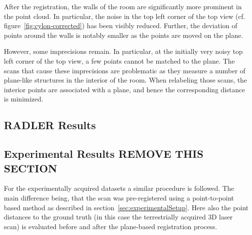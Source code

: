 After the registration, the walls of the room are significantly more prominent in the point cloud. 
In particular, the noise in the top left corner of the top view (cf. figure~\ref{fig:cylon-corrected}) has been visibly reduced.
Further, the deviation of points around the walls is notably smaller as the points are moved on the plane.

However, some imprecisions remain. 
In particular, at the initially very noisy top left corner of the top view, a few points cannot be matched to the plane. 
The scans that cause these imprecisions are problematic as they measure a number of plane-like structures in the interior of the room. 
When relabeling those scans, the interior points are associated with a plane, and hence the corresponding distance is minimized. 


\iffalse
\subsection{RADLER Results}

\subsection{Experimental Results REMOVE THIS SECTION}

For the experimentally acquired datasets a similar procedure is followed. 
The main difference being, that the scan was pre-registered using a point-to-point based method as described in section~\ref{sec:experimentalSetup}. 
Here also the point distances to the ground truth (in this case the terrestrially acquired 3D laser scan) is evaluated before and after the plane-based registration process. 

